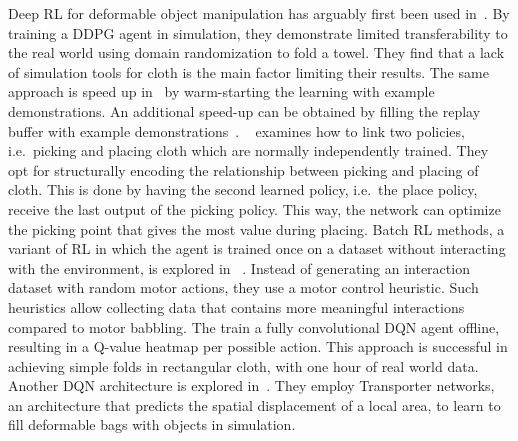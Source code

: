 \documentclass[\home/main.tex]{subfiles}
\begin{document}
Deep RL for deformable object manipulation has arguably first been used in~\autocite{Matas2018}. By training a DDPG agent in simulation, they demonstrate limited transferability to the real world using domain randomization to fold a towel. They find that a lack of simulation tools for cloth is the main factor limiting their results. The same approach is speed up in~\autocite{Jangir2020} by warm-starting the learning with example demonstrations. An additional speed-up can be obtained by filling the replay buffer with example demonstrations~\autocite{Tsurumine2019}. ~\textcite{Wu2020} examines how to link two policies, i.e.\ picking and placing cloth which are normally independently trained. They opt for structurally encoding the relationship between picking and placing of cloth. This is done by having the second learned policy, i.e.\ the place policy, receive the last output of the picking policy. This way, the network can optimize the picking point that gives the most value during placing. Batch RL methods, a variant of RL in which the agent is trained once on a dataset without interacting with the environment, is explored in ~\autocite{lee2020learning}. Instead of generating an interaction dataset with random motor actions, they use a motor control heuristic. Such heuristics allow collecting data that contains more meaningful interactions compared to motor babbling. The train a fully convolutional DQN agent offline, resulting in a Q-value heatmap per possible action. This approach is successful in achieving simple folds in rectangular cloth, with one hour of real world data. Another DQN architecture is explored in~\autocite{seita2021learning}. They employ Transporter networks, an architecture that predicts the spatial displacement of a local area, to learn to fill deformable bags with objects in simulation. 
\end{document}
